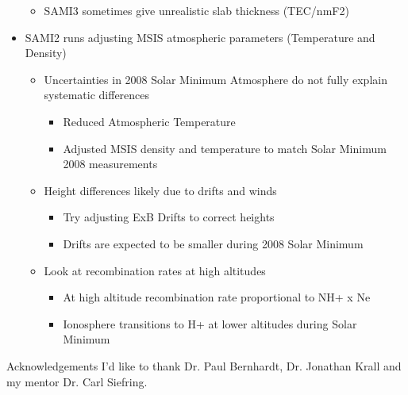 \documentclass{beamer}
\begin{document}
\begin{frame}
\begin{itemize}
\begin{itemize}
      \item    SAMI3 sometimes give unrealistic slab thickness (TEC/nmF2)
    \end{itemize}
  \item    SAMI2 runs adjusting MSIS atmospheric parameters (Temperature and Density)
    \begin{itemize}
\Tiny
      \item    Uncertainties in 2008 Solar Minimum Atmosphere do not fully explain systematic differences
	\begin{itemize}
\Tiny
	  \item    Reduced Atmospheric Temperature 
	  \item    Adjusted MSIS density and temperature to match Solar Minimum 2008 measurements
	\end{itemize}
      \item    Height differences likely due to drifts and winds
	\begin{itemize}
\Tiny
	  \item    Try adjusting ExB Drifts to correct heights
	  \item    Drifts are expected to be smaller during 2008 Solar Minimum
	\end{itemize}
      \item    Look at recombination rates at high altitudes
	\begin{itemize}
\Tiny
	  \item    At high altitude recombination rate proportional to NH+ x  Ne
	  \item    Ionosphere transitions to H+ at lower altitudes during Solar Minimum
	\end{itemize}
    \end{itemize}
\end{itemize}
\end{frame}

\begin{frame}{Acknowledgements}
 I'd like to thank Dr. Paul Bernhardt, Dr. Jonathan Krall and my mentor Dr. Carl Siefring.
\end{frame}
\end{document}

